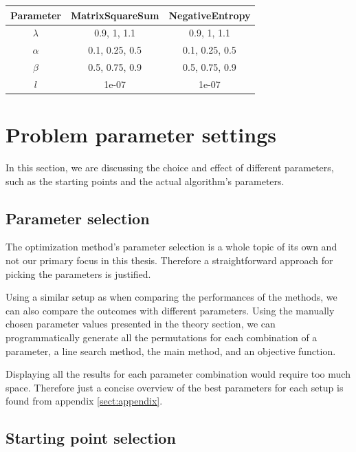 \documentclass[english, 12pt, a4paper, sci, utf8, a-1b, online, table]{aaltothesis}
\begin{document}
\begin{table}[H]
\label{tab:params_ArmijoSearch}
\centering
{}
\begin{tabular}{|c|c|c|}
\hline
\rowcolor{gray!25}
Parameter & MatrixSquareSum & NegativeEntropy \\
\hline
$\lambda$ & 0.9, 1, 1.1 & 0.9, 1, 1.1 \\
$\alpha$ & 0.1, 0.25, 0.5 & 0.1, 0.25, 0.5 \\
$\beta$ & 0.5, 0.75, 0.9 & 0.5, 0.75, 0.9 \\
$l$ & 1e-07 & 1e-07 \\
\hline
\end{tabular}
\end{table}


\section{Problem parameter settings}
\label{sect:problem_parameter_settings}


In this section, we are discussing the choice and effect of different parameters, such as the starting points and the actual algorithm's parameters.


\subsection{Parameter selection}
\label{sect:parameter_selection}


The optimization method's parameter selection is a whole topic of its own and not our primary focus in this thesis. Therefore a straightforward approach for picking the parameters is justified.

Using a similar setup as when comparing the performances of the methods, we can also compare the outcomes with different parameters. Using the manually chosen parameter values presented in the theory section, we can programmatically generate all the permutations for each combination of a parameter, a line search method, the main method, and an objective function.

Displaying all the results for each parameter combination would require too much space. Therefore just a concise overview of the best parameters for each setup is found from appendix \ref{sect:appendix}.


\subsection{Starting point selection}
\label{sect:starting_point_selection}
\end{document}

